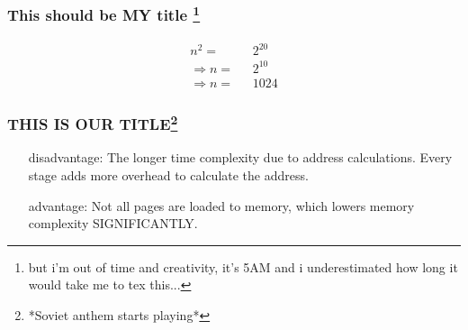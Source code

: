 \documentclass[a4paper, 11pt]{article}
\begin{document}
\subsubsection[This should be MY title]{This should be MY title \footnote{but i'm out of time and creativity, it's 5AM and i underestimated how long it would take me to tex this...}}
\begin{align}
  n^2=&\mbox{ } 2^{20}\\
  \Rightarrow n=&\mbox{ } 2^{10}\\
  \Rightarrow n=&\mbox{ } 1024
\end{align}
\subsubsection[THIS IS OUR TITLE]{THIS IS OUR TITLE\footnote{*Soviet anthem starts playing*}}
\begin{itemize}[leftmargin=\parindent+1in]
  \item[disadvantage:] The longer time complexity due to address calculations. Every stage adds more overhead to calculate the address. 
  \item[advantage:] Not all pages are loaded to memory, which lowers memory complexity SIGNIFICANTLY.
\end{itemize}
\end{document}
